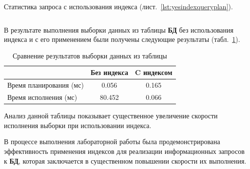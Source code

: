 \documentclass[14pt]{extarticle}
\makeatletter
\newcounter{sectionc}%
\newcommand{\nonumbersections}{\renewcommand{\Hy@numberline}[1]{}}
\let\oldsectionc\sectionc
\renewcommand{\sectionc}{\nonumbersections\oldsectionc}
\makeatother
\begin{document}

Статистика запроса с использования индекса (лист.~\ref{lst:yesindexqueryplan}).

\begin{listing}[!htpb]
  \caption{Статистика запроса (с использованием индекса)\label{lst:yesindexqueryplan}}
  \inputminted{postgresql}{list/yesindexqueryplan.txt}
\end{listing}


В результате выполнения выборки данных из таблицы \textbf{БД} без использования индекса и с его применением были получены следующие результаты (табл.~\ref{t:tab1}).

\begin{table}[!htpb]
	\centering
	\caption{Сравнение результатов выборки данных из таблицы\label{t:tab1}}
	\begin{tabular}{|p{}|c|c|}
	\hline
	~&\textbf{Без индекса}&\textbf{C индексом}\\
	\hline
	Время планирования (мс)&0.056&0.165\\
	\hline
	Время исполнения (мс)&80.452&0.066\\
	\hline
	\end{tabular}
\end{table}

Анализ данной таблицы показывает существенное увеличение скорости исполнения выборки при использовании индекса.


В процессе выполнения лабораторной работы была продемонстрирована эффективность применения индексов для реализации информационных запросов к \textbf{БД}, которая заключается в существенном повышении скорости их выполнения.
\end{document}
